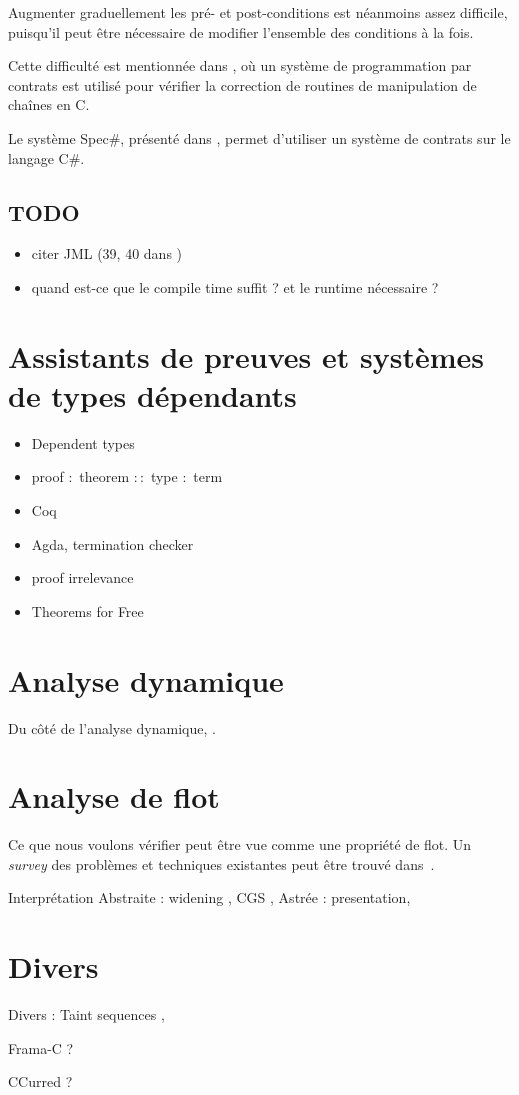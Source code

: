 Augmenter graduellement les pré- et post-conditions est néanmoins assez
difficile, puisqu'il peut être nécessaire de modifier l'ensemble des conditions
à la fois.

Cette difficulté est mentionnée dans \cite{cssv}, où un système de programmation
par contrats est utilisé pour vérifier la correction de routines de manipulation
de chaînes en C.

Le système Spec\#, présenté dans \cite{krml136}, permet d'utiliser un système de
contrats sur le langage C\#.

\subsection*{TODO}

\begin{itemize}
\item
  citer JML (39, 40 dans \cite{krml136})
\item
  quand est-ce que le compile time suffit ? et le runtime nécessaire ?
\end{itemize}

\section{Assistants de preuves et systèmes de types dépendants}

\begin{itemize}
\item Dependent types
\item proof $:$ theorem $::$ type $:$ term
\item Coq
\item Agda, termination checker
\item proof irrelevance
\item Theorems for Free\cite{theoremsforfree}
\end{itemize}


\section{Analyse dynamique}

Du côté de l'analyse dynamique, \cite{oakland10}.

\section{Analyse de flot}

Ce que nous voulons vérifier peut être vue comme une propriété de flot. Un
\emph{survey} des problèmes et techniques existantes peut être trouvé
dans~\cite{sm-jsac03}.

\wip{}

Interprétation Abstraite :
    widening \cite{granger},
    CGS \cite{cgs},
    Astrée : presentation\cite{Astree04,Astree05},

\section{Divers}

Divers : Taint sequences \cite{mdv10},

Frama-C ?

CCurred ?
